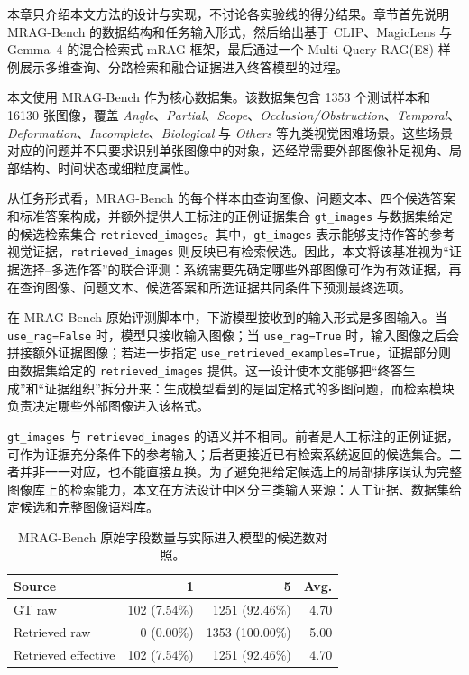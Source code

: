 本章只介绍本文方法的设计与实现，不讨论各实验线的得分结果。章节首先说明 MRAG-Bench 的数据结构和任务输入形式，然后给出基于 CLIP、MagicLens 与 Gemma~4 的混合检索式 mRAG 框架，最后通过一个 Multi Query RAG(E8) 样例展示多维查询、分路检索和融合证据进入终答模型的过程。

本文使用 MRAG-Bench 作为核心数据集。该数据集包含 1353 个测试样本和 16130 张图像，覆盖 \textit{Angle}、\textit{Partial}、\textit{Scope}、\textit{Occlusion/Obstruction}、\textit{Temporal}、\textit{Deformation}、\textit{Incomplete}、\textit{Biological} 与 \textit{Others} 等九类视觉困难场景\cite{hu2024mragbench}。这些场景对应的问题并不只要求识别单张图像中的对象，还经常需要外部图像补足视角、局部结构、时间状态或细粒度属性。

从任务形式看，MRAG-Bench 的每个样本由查询图像、问题文本、四个候选答案和标准答案构成，并额外提供人工标注的正例证据集合 \texttt{gt\_images} 与数据集给定的候选检索集合 \texttt{retrieved\_images}。其中，\texttt{gt\_images} 表示能够支持作答的参考视觉证据，\texttt{retrieved\_images} 则反映已有检索候选。因此，本文将该基准视为“证据选择--多选作答”的联合评测：系统需要先确定哪些外部图像可作为有效证据，再在查询图像、问题文本、候选答案和所选证据共同条件下预测最终选项。

在 MRAG-Bench 原始评测脚本中，下游模型接收到的输入形式是多图输入。当 \texttt{use\_rag=False} 时，模型只接收输入图像；当 \texttt{use\_rag=True} 时，输入图像之后会拼接额外证据图像；若进一步指定 \texttt{use\_retrieved\_examples=True}，证据部分则由数据集给定的 \texttt{retrieved\_images} 提供。这一设计使本文能够把“终答生成”和“证据组织”拆分开来：生成模型看到的是固定格式的多图问题，而检索模块负责决定哪些外部图像进入该格式。

\texttt{gt\_images} 与 \texttt{retrieved\_images} 的语义并不相同。前者是人工标注的正例证据，可作为证据充分条件下的参考输入；后者更接近已有检索系统返回的候选集合。二者并非一一对应，也不能直接互换。为了避免把给定候选上的局部排序误认为完整图像库上的检索能力，本文在方法设计中区分三类输入来源：人工证据、数据集给定候选和完整图像语料库。

\begin{table}[!htb]
\centering
\caption{MRAG-Bench 原始字段数量与实际进入模型的候选数对照。}
\label{tab:mrag_candidate_count_compare}
\begin{tabular}{lrrr}
\toprule
\textbf{Source} & \textbf{1} & \textbf{5} & \textbf{Avg.} \\
\midrule
GT raw & 102 (7.54\%) & 1251 (92.46\%) & 4.70 \\
Retrieved raw & 0 (0.00\%) & 1353 (100.00\%) & 5.00 \\
Retrieved effective & 102 (7.54\%) & 1251 (92.46\%) & 4.70 \\
\bottomrule
\end{tabular}
\end{table}

